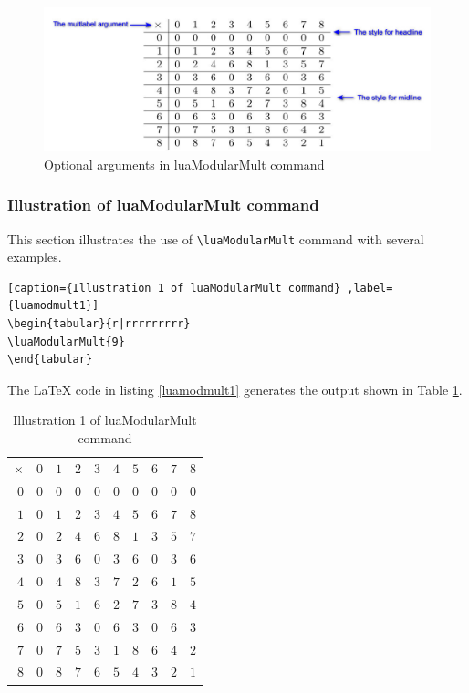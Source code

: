 ﻿\documentclass{article}
\begin{document}
\begin{figure}[!ht] %
  \centering
  \includegraphics[scale=0.273]{luaModularMult.jpg}
  \caption{Optional arguments in luaModularMult command}
  \label{fig:luaModularMult}
\end{figure}

\subsubsection{Illustration  of luaModularMult command}This section illustrates the use of \verb|\luaModularMult| command with several examples.
\begin{lstlisting}[caption={Illustration 1 of luaModularMult command} ,label={luamodmult1}]
\begin{tabular}{r|rrrrrrrrr}
\luaModularMult{9}
\end{tabular}
\end{lstlisting}

The LaTeX code in listing \ref{luamodmult1} generates the output shown in Table  \ref{luamodmult1tbl}.


\begin{table}[H]
\centering
\begin{tabular}{r|rrrrrrrrr}
$\times$ & $0$ & $1$ & $2$ & $3$ & $4$ & $5$ & $6$ & $7$ & $8$\\ $0$ & $0$ & $0$ & $0$ & $0$ & $0$ & $0$ & $0$ & $0$ & $0$\\ $1$ & $0$ & $1$ & $2$ & $3$ & $4$ & $5$ & $6$ & $7$ & $8$\\ $2$ & $0$ & $2$ & $4$ & $6$ & $8$ & $1$ & $3$ & $5$ & $7$\\ $3$ & $0$ & $3$ & $6$ & $0$ & $3$ & $6$ & $0$ & $3$ & $6$\\ $4$ & $0$ & $4$ & $8$ & $3$ & $7$ & $2$ & $6$ & $1$ & $5$\\ $5$ & $0$ & $5$ & $1$ & $6$ & $2$ & $7$ & $3$ & $8$ & $4$\\ $6$ & $0$ & $6$ & $3$ & $0$ & $6$ & $3$ & $0$ & $6$ & $3$\\ $7$ & $0$ & $7$ & $5$ & $3$ & $1$ & $8$ & $6$ & $4$ & $2$\\ $8$ & $0$ & $8$ & $7$ & $6$ & $5$ & $4$ & $3$ & $2$ & $1$
\end{tabular} 
\caption{Illustration 1 of luaModularMult command}
\label{luamodmult1tbl}
\end{table}
\end{document}
